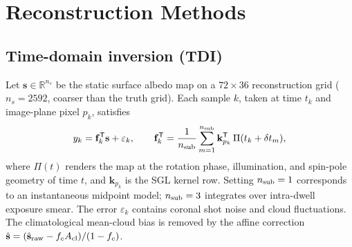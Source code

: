 \documentclass[twocolumn]{emulateapj}
\begin{document}
\section{Reconstruction Methods}
\label{sec:methods}

\subsection{Time-domain inversion (TDI)}
Let $\mathbf{s}\in\mathbb{R}^{n_s}$ be the static surface albedo map on
a $72\times36$ reconstruction grid ($n_s=2592$, coarser than the truth grid).
Each sample $k$, taken at time $t_k$ and image-plane pixel $p_k$, satisfies
\begin{equation}
y_k=\mathbf{f}_k^{\sf T}\mathbf{s}+\varepsilon_k,\qquad
\mathbf{f}_k^{\sf T}=\frac{1}{n_{\rm sub}}\sum_{m=1}^{n_{\rm sub}}\mathbf{k}_{p_k}^{\sf T}\,\Pi(t_k+\delta t_m),
\label{eq:forward}
\end{equation}
where $\Pi(t)$ renders the map at the rotation phase, illumination, and
spin-pole geometry of time $t$, and $\mathbf{k}_{p_k}$ is the SGL kernel row.
Setting $n_{\rm sub}=1$ corresponds to an instantaneous midpoint model;
$n_{\rm sub}=3$ integrates over intra-dwell exposure smear.
The error $\varepsilon_k$ contains coronal shot noise and cloud fluctuations.
The climatological mean-cloud bias is removed by the affine correction
$\hat{\mathbf{s}}=(\hat{\mathbf{s}}_{\rm raw}-f_cA_{\rm cl})/(1-f_c)$.
\end{document}
